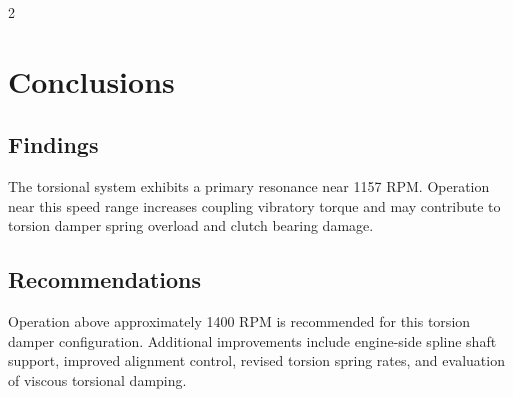 \documentclass[
	a4paper,
]{CSMakotoTechnicalReport}
\begin{document}
\begin{multicols}{2}
\section{Conclusions}

\subsection{Findings}

The torsional system exhibits a primary resonance near 1157 RPM. Operation near this speed range increases coupling vibratory torque and may contribute to torsion damper spring overload and clutch bearing damage.

\subsection{Recommendations}

Operation above approximately 1400 RPM is recommended for this torsion damper configuration. Additional improvements include engine-side spline shaft support, improved alignment control, revised torsion spring rates, and evaluation of viscous torsional damping.


\newpage

\printbibliography[title=Reference List]

\end{multicols}
\end{document}
